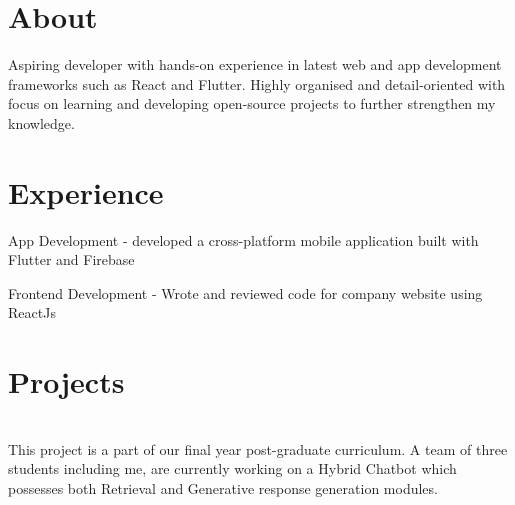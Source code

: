 \documentclass[]{dev-cv}
\begin{document}
\begin{minipage}[t]{0.66\textwidth} 

\section{About}
\vspace{\topsep}
Aspiring developer with hands-on experience in latest web and app development frameworks such as React and Flutter. Highly organised and detail-oriented with focus on learning and developing open-source projects to further strengthen my knowledge.
\sectionsep

\section{Experience}

\vspace{\topsep}
\begin{tightemize}
\item App Development - developed a cross-platform mobile application built with Flutter and Firebase 
\item Frontend Development - Wrote and reviewed code for company website using ReactJs
\end{tightemize}
\sectionsep


\section{Projects}
 \\
\vspace{\topsep}
This project is a part of our final year post-graduate curriculum. A team of three students including me, are currently working on a Hybrid Chatbot which possesses both Retrieval and Generative response generation modules.  
\sectionsep


\end{minipage}
\end{document}
